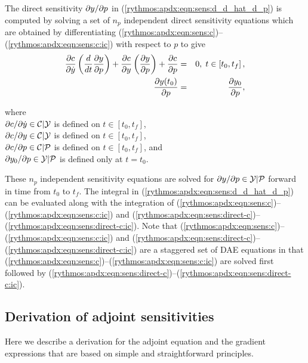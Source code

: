 \documentclass[pdf,ps2pdf,11pt]{SANDreport}
\begin{document}
The direct sensitivity $\partial y / \partial p$ in
(\ref{rythmos:apdx:eqn:sens:d_d_hat_d_p}) is computed by solving a set of
$n_p$ independent direct sensitivity equations which are obtained by
differentiating
(\ref{rythmos:apdx:eqn:sens:c})--(\ref{rythmos:apdx:eqn:sens:c:ic}) with
respect to $p$ to give
%
\begin{eqnarray}
%
\Jac{c}{\dot{y}} \left(\frac{d}{dt} \Jac{y}{p} \right) + \Jac{c}{y} \left(\Jac{y}{p}\right)
+ \Jac{c}{p} & = & 0, \; t \in \left[ t_0, t_f \right], \label{rythmos:apdx:eqn:sens:direct-c} \\
\Jac{y(t_0)}{p} & = & \Jac{y_0}{p}, \label{rythmos:apdx:eqn:sens:direct-c:ic}
\end{eqnarray}
\begin{tabbing}
\hspace{4ex}where\hspace{1ex}\= \\
\>	$\partial c / \partial \dot{y} \in \mathcal{C}|\mathcal{Y}$ is defined on $t\in[t_0,t_f]$, \\
\>	$\partial c / \partial y \in \mathcal{C}|\mathcal{Y}$ is defined on $t\in[t_0,t_f]$, \\
\>	$\partial c / \partial p \in \mathcal{C}|\mathcal{P}$ is defined on $t\in[t_0,t_f]$, and \\
\>	$\partial y_0 / \partial p \in \mathcal{Y}|\mathcal{P}$ is defined only at $t=t_0$.
\end{tabbing}

These $n_p$ independent sensitivity equations are solved for $\partial y / \partial p
{}\in\mathcal{Y}|\mathcal{P}$ forward in time from $t_0$ to $t_f$.  The
integral in (\ref{rythmos:apdx:eqn:sens:d_d_hat_d_p}) can be evaluated along
with the integration of
(\ref{rythmos:apdx:eqn:sens:c})--(\ref{rythmos:apdx:eqn:sens:c:ic}) and
(\ref{rythmos:apdx:eqn:sens:direct-c})--(\ref{rythmos:apdx:eqn:sens:direct-c:ic}).
Note that (\ref{rythmos:apdx:eqn:sens:c})--(\ref{rythmos:apdx:eqn:sens:c:ic})
and
(\ref{rythmos:apdx:eqn:sens:direct-c})--(\ref{rythmos:apdx:eqn:sens:direct-c:ic})
are a staggered set of DAE equations in that
(\ref{rythmos:apdx:eqn:sens:c})--(\ref{rythmos:apdx:eqn:sens:c:ic}) are solved
first followed by
(\ref{rythmos:apdx:eqn:sens:direct-c})--(\ref{rythmos:apdx:eqn:sens:direct-c:ic}).

\subsection{Derivation of adjoint sensitivities}

Here we describe a derivation for the adjoint equation and the gradient
expressions that are based on simple and straightforward principles.
\end{document}
